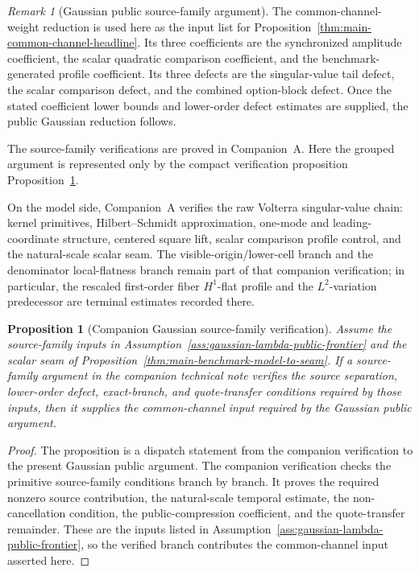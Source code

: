 \documentclass[11pt,a4paper]{amsart}
\theoremstyle{plain}
\newtheorem{proposition}[theorem]{Proposition}
\theoremstyle{definition}
\theoremstyle{remark}
\newtheorem{remark}[theorem]{Remark}
\begin{document}
\begin{remark}[Gaussian public source-family argument]\label{rem:gaussian-lambda-public-frontier}
The common-channel-weight reduction is used here as the input list for
Proposition~\ref{thm:main-common-channel-headline}.  Its three coefficients are the synchronized
amplitude coefficient, the scalar quadratic comparison coefficient, and the benchmark-generated
profile coefficient.  Its three defects are the singular-value tail defect, the scalar comparison
defect, and the combined option-block defect.  Once the stated coefficient lower bounds and
lower-order defect estimates are supplied, the public Gaussian reduction follows.

The source-family verifications are proved in Companion~A.  Here the grouped
argument is represented only by the compact verification proposition
Proposition~\ref{prop:gaussian-lambda-public-frontier-source-pair-dispatcher}.

On the model side, Companion~A verifies the raw Volterra singular-value chain: kernel
primitives, Hilbert--Schmidt approximation, one-mode and leading-coordinate structure, centered
square lift, scalar comparison profile control, and the natural-scale scalar seam.  The
visible-origin/lower-cell branch and the denominator local-flatness branch remain part of that
companion verification; in particular, the rescaled first-order fiber \(H^1\)-flat profile and the
\(L^2\)-variation predecessor are terminal estimates recorded there.
\end{remark}

\begin{proposition}[Companion Gaussian source-family verification]\label{prop:gaussian-lambda-public-frontier-source-pair-dispatcher}
Assume the source-family inputs in Assumption~\ref{ass:gaussian-lambda-public-frontier} and the scalar
seam of Proposition~\ref{thm:main-benchmark-model-to-seam}.  If a source-family argument in the companion
technical note verifies the source separation, lower-order defect, exact-branch, and quote-transfer
conditions required by those inputs, then it supplies the common-channel input required by the
Gaussian public argument.
\end{proposition}

\begin{proof}
The proposition is a dispatch statement from the companion verification to the present Gaussian
public argument.  The companion verification checks the primitive source-family conditions branch
by branch.  It proves the required nonzero source contribution, the natural-scale temporal estimate,
the non-cancellation condition, the public-compression coefficient, and the quote-transfer
remainder.  These are the inputs listed in
Assumption~\ref{ass:gaussian-lambda-public-frontier}, so the verified branch contributes the
common-channel input asserted here.
\end{proof}
\end{document}
